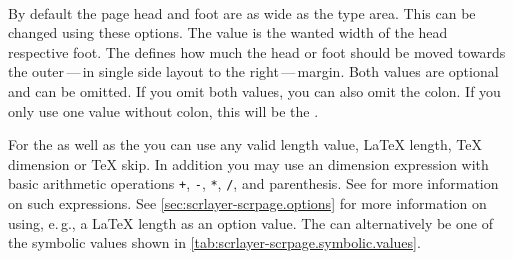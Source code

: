 
\begin{Declaration}
  \\
\end{Declaration}
%
%
By default the page head and foot are as
wide as the type area. This can be changed using these \KOMAScript{}
options. The value  is the wanted width of the head respective
foot. The  defines how much the head or foot should be moved
towards the outer\,---\,in single side layout to the right\,---\,margin. Both
values are optional and can be omitted. If you omit both values, you can also
omit the colon. If you only use one value without colon, this will be the
.

For the  as well as the  you can use any valid
length value, \LaTeX{} length, \TeX{} dimension or \TeX{} skip. In addition
you may use an \eTeX{} dimension expression with basic arithmetic operations
\texttt{+}, \texttt{-}, \texttt{*}, \texttt{/}, and parenthesis. See
\cite[section~3.5]{manual:eTeX} for more information on such expressions.  See
\autoref{sec:scrlayer-scrpage.options} for more information on using,
e.\,g., a \LaTeX{} length as an option value. The  can
alternatively be one of the symbolic values shown in
\autoref{tab:scrlayer-scrpage.symbolic.values}.

